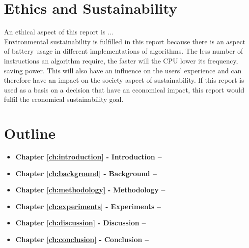 \section{Ethics and Sustainability}
An ethical aspect of this report is ...\\

Environmental sustainability is fulfilled in this report because there is an aspect of battery usage in different implementations of algorithms. The less number of instructions an algorithm require, the faster will the CPU lower its frequency, saving power. This will also have an influence on the users' experience and can therefore have an impact on the society aspect of sustainability. If this report is used as a basis on a decision that have an economical impact, this report would fulfil the economical sustainability goal.

\section{Outline}
\begin{itemize}
    \item \textbf{Chapter \ref{ch:introduction} - Introduction --}
    \item \textbf{Chapter \ref{ch:background} - Background --}
    \item \textbf{Chapter \ref{ch:methodology} - Methodology --}
    \item \textbf{Chapter \ref{ch:experiments} - Experiments --}
    \item \textbf{Chapter \ref{ch:discussion} - Discussion --}
    \item \textbf{Chapter \ref{ch:conclusion} - Conclusion --}
\end{itemize}
